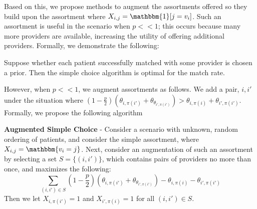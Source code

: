 Based on this, we propose methods to augment the assortments offered so they build upon the assortment where $X_{i,j} = \mathbbm{1}[j=v_{i}]$. 
Such an assortment is useful in the scenario when $p<<1$; this occurs because many more providers are available, increasing the utility of offering additional providers. 
Formally, we demonstrate the following: 
\begin{corollary}
    Suppose whether each patient successfully matched with some provider is chosen a prior. Then the simple choice algorithm is optimal for the match rate. 
\end{corollary}
However, when $p<<1$, we augment assortments as follows. 
We add a pair, $i,i'$ under the situation where $(1-\frac{p}{2})(\theta_{i,\pi(i')} + \theta_{\theta_{i',\pi(i')}}) > \theta_{i,\pi(i)} + \theta_{i',\pi(i')}$. 
Formally, we propose the following algorithm
\begin{definition}
    \textbf{Augmented Simple Choice} - Consider a scenario with unknown, random ordering of patients, and consider the simple assortment, where $X_{i,j} = \mathbbm{v_{i}=j}$. Next, consider an augmentation of such an assortment by selecting a set $S = \{(i,i')\}$, which contains pairs of providers no more than once, and maximizes the following: 
    \begin{equation}
        \sum_{(i,i') \in S} (1-\frac{p}{2})(\theta_{i,\pi(i')} + \theta_{\theta_{i',\pi(i')}}) - \theta_{i,\pi(i)} - \theta_{i',\pi(i')}
    \end{equation}
    Then we let $X_{i,\pi(i')} = 1$ and $X_{i',\pi(i)} = 1$ for all $(i,i') \in S$. 
\end{definition}


